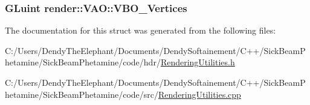 \subsubsection[{\texorpdfstring{V\+B\+O\+\_\+\+Vertices}{VBO_Vertices}}]{\setlength{\rightskip}{0pt plus 5cm}G\+Luint render\+::\+V\+A\+O\+::\+V\+B\+O\+\_\+\+Vertices}\hypertarget{structrender_1_1_v_a_o_a41b864db7e017ec319c3e245d6400d65}{}\label{structrender_1_1_v_a_o_a41b864db7e017ec319c3e245d6400d65}


The documentation for this struct was generated from the following files\+:\begin{DoxyCompactItemize}
\item 
C\+:/\+Users/\+Dendy\+The\+Elephant/\+Documents/\+Dendy\+Softainement/\+C++/\+Sick\+Beam\+Phetamine/\+Sick\+Beam\+Phetamine/code/hdr/\hyperlink{_rendering_utilities_8h}{Rendering\+Utilities.\+h}\item 
C\+:/\+Users/\+Dendy\+The\+Elephant/\+Documents/\+Dendy\+Softainement/\+C++/\+Sick\+Beam\+Phetamine/\+Sick\+Beam\+Phetamine/code/src/\hyperlink{_rendering_utilities_8cpp}{Rendering\+Utilities.\+cpp}\end{DoxyCompactItemize}

